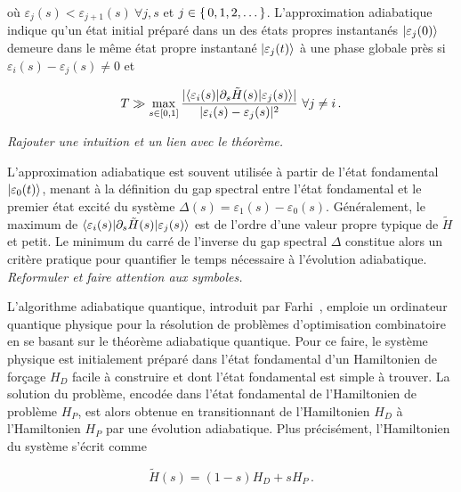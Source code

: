où $\varepsilon_{j}(s) < \varepsilon_{j+1}(s) \ \forall j,s$ et $j \in \set{ 0, 1, 2, \dots }$. L'approximation adiabatique indique qu'un état initial préparé dans un des états propres instantanés $\ket{\varepsilon_{j}(0)}$ demeure dans le même état propre instantané $\ket{\varepsilon_{j}(t)}$ à une phase globale près si $\varepsilon_{i}(s) - \varepsilon_{j}(s) \neq  0$ et

\begin{equation}
    T \gg \max_{s \in [0,1]} \frac{\lvert \braket{ \varepsilon_{i}(s) | \partial_{s} \tilde{H}(s) | \varepsilon_{j}(s) } \rvert }{\lvert \varepsilon_{i}(s) - \varepsilon_{j}(s) \rvert^{2} } \ \forall j \neq i \,.
\end{equation}



\textcolor{mydarkred}{\textit{Rajouter une intuition et un lien avec le théorème.}}

L'approximation adiabatique est souvent utilisée à partir de l'état fondamental $\ket{\varepsilon_{0}(t)}$, menant à la définition du gap spectral entre l'état fondamental et le premier état excité du système $\Delta(s) = \varepsilon_{1}(s) - \varepsilon_{0}(s)$. Généralement, le maximum de $\braket{ \varepsilon_{i}(s) | \partial_{s} \tilde{H}(s) | \varepsilon_{j}(s)}$ est de l'ordre d'une valeur propre typique de $\tilde{H}$ et petit. Le minimum du carré de l'inverse du gap spectral $\Delta$ constitue alors un critère pratique pour quantifier le temps nécessaire à l'évolution adiabatique. \textcolor{mydarkred}{\textit{Reformuler et faire attention aux symboles.}}

L'algorithme adiabatique quantique, introduit par Farhi~\cite{farhiQuantumComputationAdiabatic2000}, emploie un ordinateur quantique physique pour la résolution de problèmes d'optimisation combinatoire en se basant sur le théorème adiabatique quantique. Pour ce faire, le système physique est initialement préparé dans l'état fondamental d'un Hamiltonien de forçage $H_{D}$ facile à construire et dont l'état fondamental est simple à trouver. La solution du problème, encodée dans l'état fondamental de l'Hamiltonien de problème $H_{P}$, est alors obtenue en transitionnant de l'Hamiltonien $H_{D}$ à l'Hamiltonien $H_{P}$ par une évolution adiabatique. Plus précisément, l'Hamiltonien du système s'écrit comme


\begin{equation}
    \tilde{H}(s) = \left(1-s\right) H_{D} + s H_{P} \,.
\end{equation}

